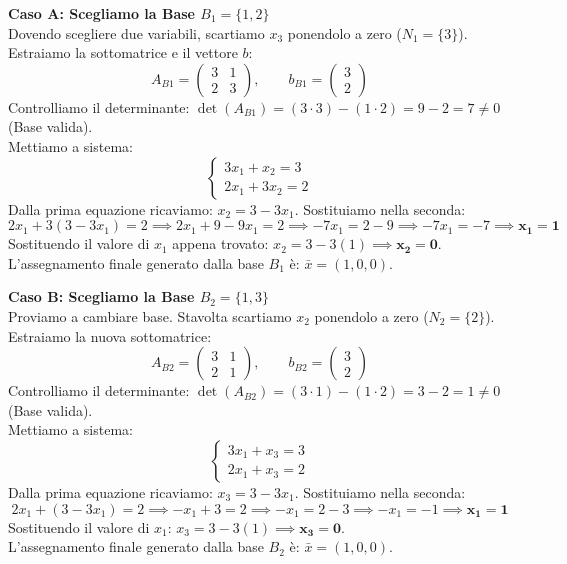 \documentclass[12pt, a4paper]{article}
\begin{document}
	\textbf{Caso A: Scegliamo la Base $B_1 = \{1, 2\}$}\\
	Dovendo scegliere due variabili, scartiamo $x_3$ ponendolo a zero ($N_1 = \{3\}$). Estraiamo la sottomatrice e il vettore $b$:
	\[
	A_{B1} = \begin{pmatrix} 3 & 1 \\ 2 & 3 \end{pmatrix}, \qquad b_{B1} = \begin{pmatrix} 3 \\ 2 \end{pmatrix}
	\]
	Controlliamo il determinante: $\det(A_{B1}) = (3 \cdot 3) - (1 \cdot 2) = 9 - 2 = 7 \neq 0$ (Base valida). \\
	Mettiamo a sistema:
	\[
	\begin{cases}
		3x_1 + x_2 = 3 \\
		2x_1 + 3x_2 = 2
	\end{cases}
	\]
	Dalla prima equazione ricaviamo: $x_2 = 3 - 3x_1$. Sostituiamo nella seconda:
	\[
	2x_1 + 3(3 - 3x_1) = 2 \implies 2x_1 + 9 - 9x_1 = 2 \implies -7x_1 = 2 - 9 \implies -7x_1 = -7 \implies \mathbf{x_1 = 1}
	\]
	Sostituendo il valore di $x_1$ appena trovato: $x_2 = 3 - 3(1) \implies \mathbf{x_2 = 0}$. \\
	L'assegnamento finale generato dalla base $B_1$ è: $\bar{x} = (1, 0, 0)$.
	
	\vspace{0.3cm}
	\textbf{Caso B: Scegliamo la Base $B_2 = \{1, 3\}$}\\
	Proviamo a cambiare base. Stavolta scartiamo $x_2$ ponendolo a zero ($N_2 = \{2\}$). Estraiamo la nuova sottomatrice:
	\[
	A_{B2} = \begin{pmatrix} 3 & 1 \\ 2 & 1 \end{pmatrix}, \qquad b_{B2} = \begin{pmatrix} 3 \\ 2 \end{pmatrix}
	\]
	Controlliamo il determinante: $\det(A_{B2}) = (3 \cdot 1) - (1 \cdot 2) = 3 - 2 = 1 \neq 0$ (Base valida). \\
	Mettiamo a sistema:
	\[
	\begin{cases}
		3x_1 + x_3 = 3 \\
		2x_1 + x_3 = 2
	\end{cases}
	\]
	Dalla prima equazione ricaviamo: $x_3 = 3 - 3x_1$. Sostituiamo nella seconda:
	\[
	2x_1 + (3 - 3x_1) = 2 \implies -x_1 + 3 = 2 \implies -x_1 = 2 - 3 \implies -x_1 = -1 \implies \mathbf{x_1 = 1}
	\]
	Sostituendo il valore di $x_1$: $x_3 = 3 - 3(1) \implies \mathbf{x_3 = 0}$. \\
	L'assegnamento finale generato dalla base $B_2$ è: $\bar{x} = (1, 0, 0)$.
	
\end{document}
